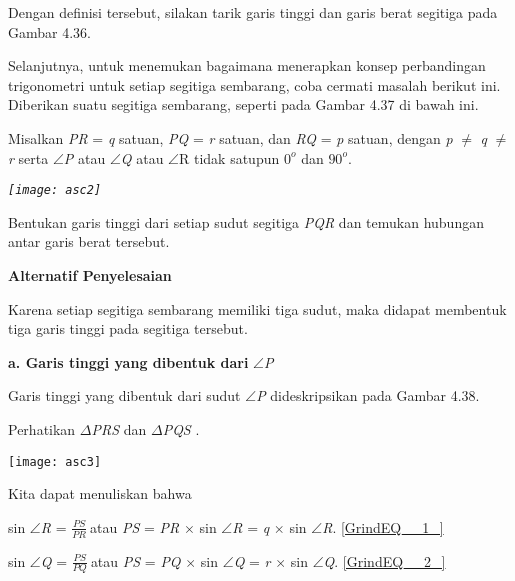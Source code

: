 \documentclass[11pt,fleqn]{book} %
\begin{document}
\begin{myEnumerate}
\begin{itemize}
Dengan definisi tersebut, silakan tarik garis tinggi dan garis berat segitiga pada Gambar 4.36.

Selanjutnya, untuk menemukan bagaimana menerapkan konsep perbandingan trigonometri untuk setiap segitiga sembarang, coba cermati masalah berikut ini. Diberikan suatu segitiga sembarang, seperti pada Gambar 4.37 di bawah ini.

\noindent Misalkan \textit{PR }= \textit{q }satuan, \textit{PQ }= \textit{r }satuan, dan \textit{RQ }= \textit{p }satuan, dengan \textit{p }$\mathrm{\neq}$ \textit{q }$\mathrm{\neq}$ \textit{r }serta $\mathrm{\angle }$\textit{P }atau $\mathrm{\angle }$\textit{Q }atau $\mathrm{\angle }$R tidak satupun $0^o$ dan $90^o$.

\noindent \textit{\texttt{[image: asc2]}}

\noindent 

\noindent Bentukan garis tinggi dari setiap sudut segitiga \textit{PQR }dan temukan hubungan antar garis berat tersebut.

\noindent 

\noindent \textbf{Alternatif Penyelesaian }

Karena setiap segitiga sembarang memiliki tiga sudut, maka didapat membentuk tiga garis tinggi pada segitiga tersebut.\textbf{}

\noindent 

\noindent \textbf{a. Garis tinggi yang dibentuk dari }$\mathrm{\angle }$\textit{P}

Garis tinggi yang dibentuk dari sudut $\mathrm{\angle }$\textit{P }dideskripsikan pada Gambar 4.38.

Perhatikan $\Delta$\textit{PRS }dan $\Delta$\textit{PQS }.

\noindent 

\noindent \texttt{[image: asc3]}

\noindent Kita dapat menuliskan bahwa

\noindent 

\noindent sin $\mathrm{\angle }$\textit{R }= $\frac{PS}{PR}\ $atau \textit{PS }= \textit{PR }$\times$ sin $\mathrm{\angle }$\textit{R }= \textit{q }$\times$ sin $\mathrm{\angle }$\textit{R}.      \eqref{GrindEQ__1_}

\noindent sin $\mathrm{\angle }$\textit{Q }= $\frac{PS}{PQ}\ $atau \textit{PS }= \textit{PQ }$\times$ sin $\mathrm{\angle }$\textit{Q }= \textit{r }$\times$ sin $\mathrm{\angle }$\textit{Q}.     \eqref{GrindEQ__2_}\textit{}


\end{itemize}
\end{myEnumerate}
\end{document}
